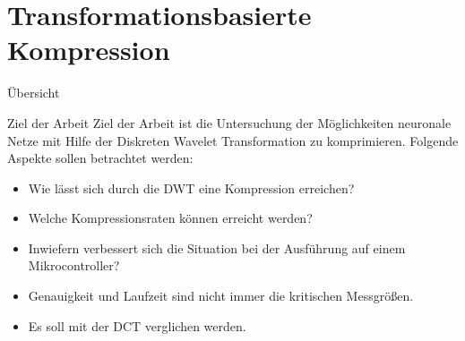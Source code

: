 \documentclass[aspectratio=169, 12pt]{beamer}
\begin{document}
\section{Transformationsbasierte Kompression}

\begin{frame}{Übersicht}
  \tableofcontents[currentsection]
\end{frame}

\begin{frame}{Ziel der Arbeit}
  Ziel der Arbeit ist die Untersuchung der Möglichkeiten neuronale Netze mit Hilfe der Diskreten Wavelet Transformation zu komprimieren.
  Folgende Aspekte sollen betrachtet werden:
  \begin{itemize}
    \item Wie lässt sich durch die DWT eine Kompression erreichen?
    \item Welche Kompressionsraten können erreicht werden?
    \item Inwiefern verbessert sich die Situation bei der Ausführung auf einem Mikrocontroller?
    \item Genauigkeit und Laufzeit sind nicht immer die kritischen Messgrößen.
    \item Es soll mit der DCT verglichen werden.
  \end{itemize}
\end{frame}

\end{document}
